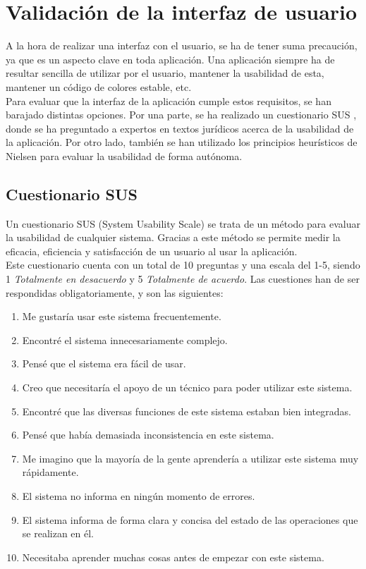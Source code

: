\section{Validación de la interfaz de usuario}

A la hora de realizar una interfaz con el usuario, se ha de tener suma precaución, ya que es un aspecto clave en toda aplicación. Una aplicación siempre ha de resultar sencilla de utilizar por el usuario, mantener la usabilidad de esta, mantener un código de colores estable, etc.
\\

Para evaluar que la interfaz de la aplicación cumple estos requisitos, se han barajado distintas opciones. Por una parte, se ha realizado un cuestionario SUS \cite{sus}, donde se ha preguntado a expertos en textos jurídicos acerca de la usabilidad de la aplicación. Por otro lado, también se han utilizado los principios heurísticos de Nielsen \cite{nielsen} para evaluar la usabilidad de forma autónoma. 


\subsection{Cuestionario SUS}

Un cuestionario SUS (System Usability Scale) se trata de un método para evaluar la usabilidad de cualquier sistema. Gracias a este método se permite medir la eficacia, eficiencia y satisfacción de un usuario al usar la aplicación.
\\

Este cuestionario cuenta con un total de 10 preguntas y una escala del 1-5, siendo 1 {\it Totalmente en desacuerdo} y 5 {\it Totalmente de acuerdo}. Las cuestiones han de ser respondidas obligatoriamente, y son las siguientes:

\begin{enumerate}
    \item Me gustaría usar este sistema frecuentemente.
    \item Encontré el sistema innecesariamente complejo.
    \item Pensé que el sistema era fácil de usar.
    \item Creo que necesitaría el apoyo de un técnico para poder utilizar este sistema.
    \item Encontré que las diversas funciones de este sistema estaban bien integradas.
    \item Pensé que había demasiada inconsistencia en este sistema.
    \item Me imagino que la mayoría de la gente aprendería a utilizar este sistema muy rápidamente.
    \item El sistema no informa en ningún momento de errores.
    \item  El sistema informa de forma clara y concisa del estado de las operaciones que se realizan en él.
    \item Necesitaba aprender muchas cosas antes de empezar con este sistema.
\end{enumerate}

